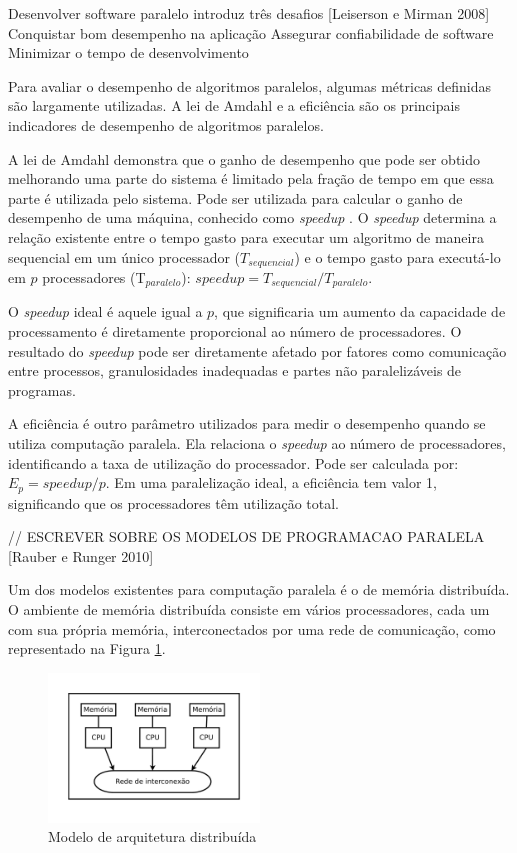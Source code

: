 Desenvolver software paralelo introduz três desafios [Leiserson e Mirman 2008]
Conquistar bom desempenho na aplicação
Assegurar confiabilidade de software
Minimizar o tempo de desenvolvimento


Para avaliar o desempenho de algoritmos paralelos, algumas métricas definidas são largamente utilizadas. A lei de Amdahl e a eficiência são os principais indicadores de desempenho de algoritmos paralelos. 

A lei de Amdahl demonstra que o ganho de desempenho que pode ser obtido melhorando uma parte do sistema é limitado pela fração de tempo em que essa parte é utilizada pelo sistema. Pode ser utilizada para calcular o ganho de desempenho de uma máquina, conhecido como \textit{speedup} \cite{Amdahl:1967}.
O \textit{speedup} determina a relação existente entre o tempo gasto para executar um algoritmo de maneira sequencial em um único processador ($T_{sequencial}$) e o tempo gasto para executá-lo em $p$ processadores (T$_{paralelo}$): $ speedup = T_{sequencial}/T_{paralelo}$.
 
O \textit{speedup} ideal é aquele igual a $p$, que significaria um aumento da capacidade de processamento é diretamente proporcional ao número de processadores. O resultado do \textit{speedup}
pode ser diretamente afetado por fatores como comunicação entre processos, granulosidades inadequadas e partes não paralelizáveis de programas.
 
A eficiência é outro parâmetro utilizados para medir o desempenho quando se utiliza computação paralela. Ela relaciona o \textit{speedup} ao número de processadores, identificando a taxa de utilização do processador. Pode ser calculada por: $E_p = speedup/p$. Em uma paralelização ideal, a eficiência tem valor 1, significando que os processadores têm utilização total.



// ESCREVER SOBRE OS MODELOS DE PROGRAMACAO PARALELA
[Rauber e Runger 2010]

Um dos modelos existentes para computação paralela é o de memória distribuída. O ambiente de memória distribuída consiste em vários processadores, cada um com sua própria memória, interconectados por uma rede de comunicação, como representado na Figura \ref{fig:ArquiteturaDistribuida}.

\begin{figure}[htb]
\centering
\includegraphics[trim=0cm 1cm 0cm 0cm, width=0.5\textwidth]{figuras/Arquitetura.pdf}
\caption{Modelo de arquitetura distribuída}
\label{fig:ArquiteturaDistribuida}
\end{figure}




